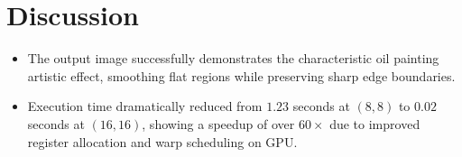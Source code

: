\documentclass{article}
\begin{document}
\section{Discussion}
\begin{itemize}
    \item The output image successfully demonstrates the characteristic oil painting artistic effect, smoothing flat regions while preserving sharp edge boundaries.
    \item Execution time dramatically reduced from $1.23$ seconds at $(8, 8)$ to $0.02$ seconds at $(16, 16)$, showing a speedup of over $60\times$ due to improved register allocation and warp scheduling on GPU.
\end{itemize}
\end{document}
